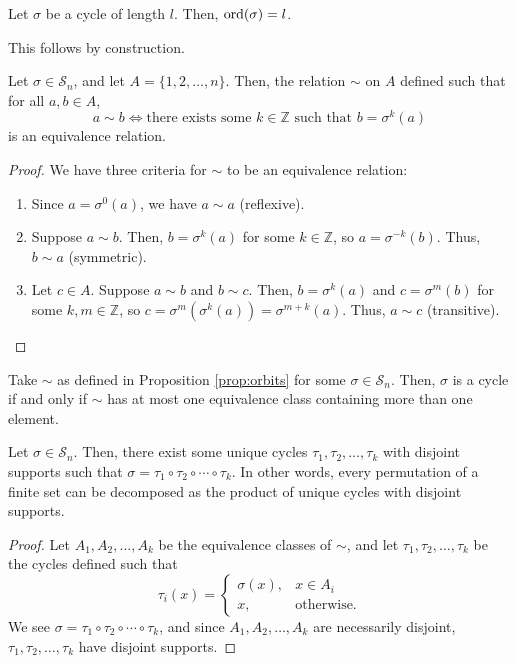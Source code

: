 \begin{prop}
Let $ \sigma $ be a cycle of length $ l $. Then, $ \operatorname{ord}(\sigma)=l $.
\end{prop}

This follows by construction.

\begin{prop}\label{prop:orbits}
Let $ \sigma\in\mathcal{S}_n $, and let $ A=\{1,2,\ldots,n\} $. Then, the relation $ \sim $ on $ A $ defined such that for all $ a,b\in A $,
\begin{equation*}
    a\sim b \iff \text{there exists some }k\in\mathbb{Z}\text{ such that }b=\sigma^k(a)
\end{equation*}
is an equivalence relation.
\end{prop}
\begin{proof}
We have three criteria for $ \sim $ to be an equivalence relation:
\begin{enumerate}
    \item Since $ a=\sigma^0(a) $, we have $ a\sim a $ (reflexive).
    \item Suppose $ a\sim b $. Then, $ b=\sigma^k(a) $ for some $ k\in\mathbb{Z} $, so $ a=\sigma^{-k}(b) $. Thus, $ b\sim a $ (symmetric).
    \item Let $ c\in A $. Suppose $ a\sim b $ and $ b\sim c $. Then, $ b=\sigma^k(a) $ and $ c=\sigma^m(b) $ for some $ k,m\in\mathbb{Z} $, so $ c=\sigma^m(\sigma^k(a))=\sigma^{m+k}(a) $. Thus, $ a\sim c $ (transitive).\qedhere
\end{enumerate}
\end{proof}

\begin{cor}
Take $ \sim $ as defined in Proposition \ref{prop:orbits} for some $ \sigma\in\mathcal{S}_n $. Then, $ \sigma $ is a cycle if and only if $ \sim $ has at most one equivalence class containing more than one element.
\end{cor}

\begin{thm}\label{thm:cycle_decomp}
Let $ \sigma\in\mathcal{S}_n $. Then, there exist some unique cycles $ \tau_1,\tau_2,\ldots,\tau_k $ with disjoint supports such that $ \sigma=\tau_1\circ\tau_2\circ\cdots\circ\tau_k $. In other words, every permutation of a finite set can be decomposed as the product of unique cycles with disjoint supports.
\end{thm}
\begin{proof}
Let $ A_1,A_2,\ldots,A_k $ be the equivalence classes of $ \sim $, and let $ \tau_1,\tau_2,\ldots,\tau_k $ be the cycles defined such that 
\begin{equation*}
    \tau_i(x)=
    \left\{\begin{array}{ll}
        \sigma(x), & x\in A_i \\
        x, & \text{otherwise.}
    \end{array}\right.
\end{equation*}
We see $ \sigma=\tau_1\circ\tau_2\circ\cdots\circ\tau_k $, and since $ A_1,A_2,\ldots,A_k $ are necessarily disjoint, $ \tau_1,\tau_2,\ldots,\tau_k $ have disjoint supports.
\end{proof}

